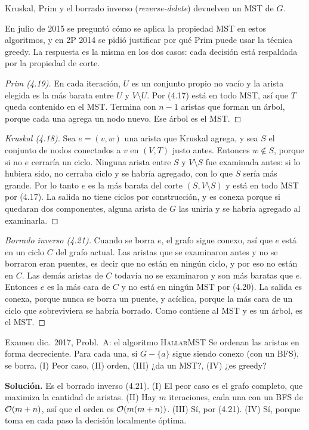 \begin{resultado}[(4.18), (4.19) y (4.21)]
Kruskal, Prim y el borrado inverso (\emph{reverse-delete}) devuelven un MST de $G$.
\end{resultado}

En julio de 2015 se preguntó cómo se aplica la propiedad MST en estos algoritmos, y en 2P 2014 se pidió justificar por qué Prim puede usar la técnica greedy. La respuesta es la misma en los dos casos: cada decisión está respaldada por la propiedad de corte.

\begin{proof}[Prim (4.19)]
En cada iteración, $U$ es un conjunto propio no vacío y la arista elegida es la más barata entre $U$ y $V\setminus U$. Por (4.17) está en todo MST, así que $T$ queda contenido en el MST. Termina con $n-1$ aristas que forman un árbol, porque cada una agrega un nodo nuevo. Ese árbol es el MST.
\end{proof}

\begin{proof}[Kruskal (4.18)]
Sea $e=(v,w)$ una arista que Kruskal agrega, y sea $S$ el conjunto de nodos conectados a $v$ en $(V,T)$ justo antes. Entonces $w\notin S$, porque si no $e$ cerraría un ciclo. Ninguna arista entre $S$ y $V\setminus S$ fue examinada antes: si lo hubiera sido, no cerraba ciclo y se habría agregado, con lo que $S$ sería más grande. Por lo tanto $e$ es la más barata del corte $(S,V\setminus S)$ y está en todo MST por (4.17). La salida no tiene ciclos por construcción, y es conexa porque si quedaran dos componentes, alguna arista de $G$ las uniría y se habría agregado al examinarla.
\end{proof}

\begin{proof}[Borrado inverso (4.21)]
Cuando se borra $e$, el grafo sigue conexo, así que $e$ está en un ciclo $C$ del grafo actual. Las aristas que se examinaron antes y no se borraron eran puentes, es decir que no están en ningún ciclo, y por eso no están en $C$. Las demás aristas de $C$ todavía no se examinaron y son más baratas que $e$. Entonces $e$ es la más cara de $C$ y no está en ningún MST por (4.20). La salida es conexa, porque nunca se borra un puente, y acíclica, porque la más cara de un ciclo que sobreviviera se habría borrado. Como contiene al MST y es un árbol, es el MST.
\end{proof}

\begin{problema}{Examen dic.~2017, Probl.~A: el algoritmo \textsc{HallarMST}}
Se ordenan las aristas en forma decreciente. Para cada una, si $G-\{a\}$ sigue siendo conexo (con un BFS), se borra. (I) Peor caso, (II) orden, (III) ¿da un MST?, (IV) ¿es greedy?

\smallskip
\textbf{Solución.} Es el borrado inverso (4.21). (I) El peor caso es el grafo completo, que maximiza la cantidad de aristas. (II) Hay $m$ iteraciones, cada una con un BFS de $\mathcal{O}(m+n)$, así que el orden es $\mathcal{O}(m(m+n))$. (III) Sí, por (4.21). (IV) Sí, porque toma en cada paso la decisión localmente óptima.
\end{problema}

